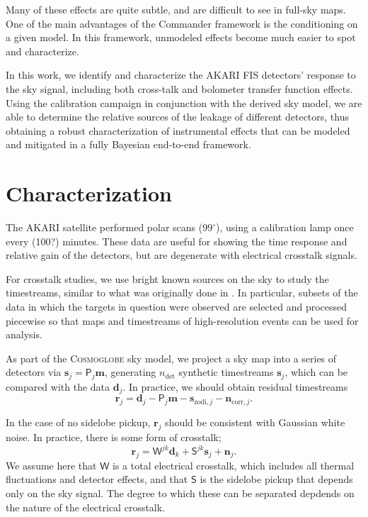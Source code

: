 \documentclass{aa}
\begin{document}
Many of these effects are quite subtle, and are difficult to see in full-sky maps. One of the main advantages of the Commander framework is the conditioning on a given model. In this framework, unmodeled effects become much easier to spot and characterize.

In this work, we identify and characterize the AKARI FIS detectors' response to the sky signal, including both cross-talk and bolometer transfer function effects. Using the calibration campaign in conjunction with the derived sky model, we are able to determine the relative sources of the leakage of different detectors, thus obtaining a robust characterization of instrumental effects that can be modeled and mitigated in a fully Bayesian end-to-end framework.

\section{Characterization}

The AKARI satellite performed polar scans ($99^\circ$), using a calibration lamp once every (100?) minutes. These data are useful for showing the time response and relative gain of the detectors, but are degenerate with electrical crosstalk signals.

For crosstalk studies, we use bright known sources on the sky to study the timestreams, similar to what was originally done in \citet{verdugo_akari_2007}.
In particular, subsets of the data in which the targets in question were observed are selected and processed piecewise so that maps and timestreams of high-resolution events can be used for analysis.

As part of the \textsc{Cosmoglobe} sky model, we project a sky map into a series of detectors via $\boldsymbol s_j=\mathsf P_j\boldsymbol m$, generating $n_\mathrm{det}$ synthetic timestreams $\boldsymbol s_j$, which can be compared with the data $\boldsymbol d_j$. In practice, we should obtain residual timestreams
\begin{equation}
	\boldsymbol r_j=\boldsymbol d_j - \mathsf P_j\boldsymbol m-\boldsymbol s_{\mathrm{zodi},j}-\boldsymbol n_{\mathrm{corr},j}.
\end{equation}

In the case of no sidelobe pickup, $\boldsymbol r_j$ should be consistent with Gaussian white noise. In practice, there is some form of crosstalk;
\[
	\boldsymbol r_j=\mathsf W^{jk}\boldsymbol d_k +\mathsf S^{jk}\boldsymbol s_j+ \boldsymbol n_j.
\]
We assume here that $\mathsf W$ is a total electrical crosstalk, which includes all thermal fluctuations and detector effects, and that $\mathsf S$ is the sidelobe pickup that depends only on the sky signal. The degree to which these can be separated depdends on the nature of the electrical crosstalk.
\end{document}
